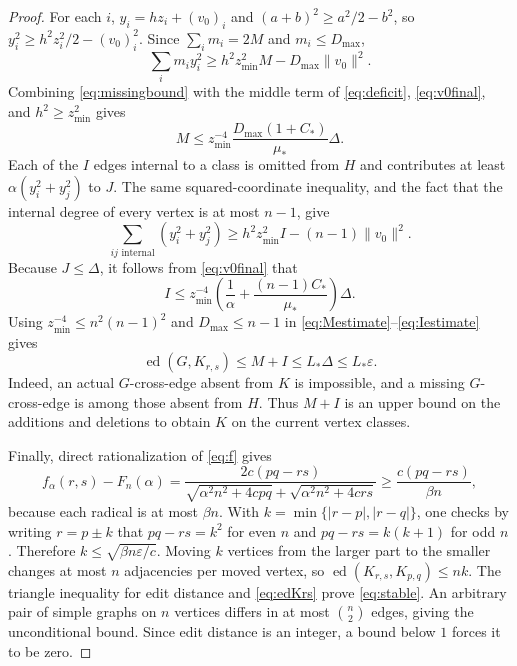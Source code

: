 \documentclass[11pt]{amsart}
\theoremstyle{definition}
\newcommand{\ee}{\operatorname{ed}}
\begin{document}
\begin{proof}
For each $i$, $y_i=hz_i+(v_0)_i$ and $(a+b)^2\ge a^2/2-b^2$, so
$y_i^2\ge h^2z_i^2/2-(v_0)_i^2$. Since $\sum_i m_i=2M$ and $m_i\le D_{\max}$,
\begin{equation}\label{eq:missingbound}
 \sum_i m_i y_i^2\ge h^2z_{\min}^2 M-D_{\max}\|v_0\|^2.
\end{equation}
Combining \eqref{eq:missingbound} with the middle term of \eqref{eq:deficit}, \eqref{eq:v0final}, and $h^2\ge z_{\min}^2$ gives
\begin{equation}\label{eq:Mestimate}
 M\le z_{\min}^{-4}\frac{D_{\max}(1+C_*)}{\mu_*}\Delta.
\end{equation}
Each of the $I$ edges internal to a class is omitted from $H$ and contributes at least $\alpha(y_i^2+y_j^2)$ to $J$. The same squared-coordinate inequality, and the fact that the internal degree of every vertex is at most $n-1$, give
\[
 \sum_{ij\text{ internal}}(y_i^2+y_j^2)
 \ge h^2z_{\min}^2 I-(n-1)\|v_0\|^2.
\]
Because $J\le\Delta$, it follows from \eqref{eq:v0final} that
\begin{equation}\label{eq:Iestimate}
 I\le z_{\min}^{-4}\left(\frac1\alpha+
 \frac{(n-1)C_*}{\mu_*}\right)\Delta.
\end{equation}
Using $z_{\min}^{-4}\le n^2(n-1)^2$ and $D_{\max}\le n-1$ in \eqref{eq:Mestimate}--\eqref{eq:Iestimate} gives
\begin{equation}\label{eq:edKrs}
 \ee(G,K_{r,s})\le M+I\le L_*\Delta\le L_*\varepsilon.
\end{equation}
Indeed, an actual $G$-cross-edge absent from $K$ is impossible, and a missing $G$-cross-edge is among those absent from $H$. Thus $M+I$ is an upper bound on the additions and deletions to obtain $K$ on the current vertex classes.

Finally, direct rationalization of \eqref{eq:f} gives
\begin{equation}\label{eq:imbalance}
 f_\alpha(r,s)-F_n(\alpha)
 =\frac{2c(pq-rs)}{\sqrt{\alpha^2n^2+4cpq}+\sqrt{\alpha^2n^2+4crs}}
 \ge\frac{c(pq-rs)}{\beta n},
\end{equation}
because each radical is at most $\beta n$. With $k=\min\{|r-p|,|r-q|\}$, one checks by writing $r=p\pm k$ that $pq-rs=k^2$ for even $n$ and $pq-rs=k(k+1)$ for odd $n$. Therefore
$k\le\sqrt{\beta n\varepsilon/c}$. Moving $k$ vertices from the larger part to the smaller changes at most $n$ adjacencies per moved vertex, so $\ee(K_{r,s},K_{p,q})\le nk$. The triangle inequality for edit distance and \eqref{eq:edKrs} prove \eqref{eq:stable}. An arbitrary pair of simple graphs on $n$ vertices differs in at most $\binom n2$ edges, giving the unconditional bound. Since edit distance is an integer, a bound below $1$ forces it to be zero.
\end{proof}
\end{document}
